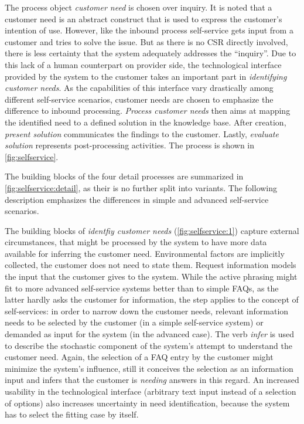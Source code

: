	The process object \textit{customer need} is chosen over inquiry. It is noted that a customer need is an abstract construct that is used to express the customer's intention of use. However, like the inbound process self-service gets input from a customer and tries to solve the issue. But as there is no \acrshort{CSR} directly involved, there is less certainty that the system adequately addresses the \enquote{inquiry}. Due to this lack of a human counterpart on provider side, the technological interface provided by the system to the customer takes an important part in \textit{identifying customer needs}. As the capabilities of this interface vary drastically among different self-service scenarios, customer needs are chosen to emphasize the difference to inbound processing. \textit{Process customer needs} then aims at mapping the identified need to a defined solution in the knowledge base. After creation, \textit{present solution} communicates the findings to the customer. Lastly, \textit{evaluate solution} represents post-processing activities. The process is shown in \Fig \ref{fig:selfservice}.
	
	The building blocks of the four detail processes are summarized in \Fig \ref{fig:selfservice:detail}, as their is no further split into variants. The following description emphasizes the differences in simple and advanced self-service scenarios. 
	
	The building blocks of \textit{identfiy customer needs} (\Fig \ref{fig:selfservice:1}) capture external circumstances, that might be processed by the system to have more data available for inferring the customer need. Environmental factors are implicitly collected, \ie the customer does not need to state them. Request information models the input that the customer gives to the system. While the active phrasing might fit to more advanced self-service systems better than to simple \acrshort{FAQ}s, as the latter hardly asks the customer for information, the step applies to the concept of self-services: in order to narrow down the customer needs, relevant information needs to be selected by the customer (in a simple self-service system) or demanded as input for the system (in the advanced case). The verb \textit{infer} is used to describe the stochastic component of the system's attempt to understand the customer need. Again, the selection of a \acrshort{FAQ} entry by the customer might minimize the system's influence, still it conceives the selection as an information input and infers that the customer is \textit{needing} answers in this regard. An increased usability in the technological interface (arbitrary text input instead of a selection of options) also increases uncertainty in need identification, because the system has to select the fitting case by itself. 
	
